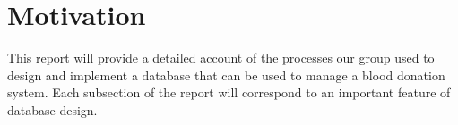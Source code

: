 




\section{Motivation}

This report will provide a detailed account of the processes our group
used to design and implement a database that can be used to manage
a blood donation system. Each subsection of the report will correspond to an
important feature of database design.

